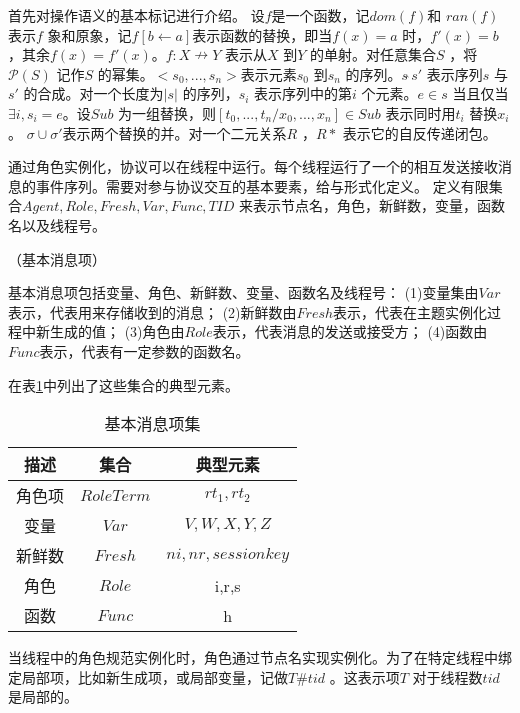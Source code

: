 首先对操作语义的基本标记进行介绍。
设$f$是一个函数，记$dom(f)$和 $ran(f)$ 表示$f$ 象和原象，记$f[b\leftarrow a]$表示函数的替换，即当$f(x)=a$ 时，$f'(x)=b$ ，其余$f(x)=f'(x)$。$f:X\nrightarrow Y$ 表示从$X$ 到$Y$ 的单射。对任意集合$S$ ，将$\mathcal{P}(S)$ 记作$S$ 的幂集。$<{{s}_{0}},...,{{s}_{n}}>$表示元素${{s}_{0}}$ 到${{s}_{n}}$ 的序列。$s\hat{\ }s'$ 表示序列$s$ 与$s'$ 的合成。对一个长度为$|s|$ 的序列，${{s}_{i}}$ 表示序列中的第$i$ 个元素。$e\in s$ 当且仅当$\exists i,{{s}_{i}}=e$。设$Sub$ 为一组替换，则$[{{t}_{0}},...,{{t}_{n}}/{{x}_{0}},...,{{x}_{n}}]\in Sub$ 表示同时用${{t}_{i}}$ 替换${{x}_{i}}$ 。 $\sigma \cup \sigma '$表示两个替换的并。对一个二元关系$R$ ，$R*$ 表示它的自反传递闭包。


通过角色实例化，协议可以在线程中运行。每个线程运行了一个的相互发送接收消息的事件序列。需要对参与协议交互的基本要素，给与形式化定义。
定义有限集合$Agent,Role,Fresh,Var,Func,TID$ 来表示节点名，角色，新鲜数，变量，函数名以及线程号。
\begin{definition}{（基本消息项）}

基本消息项包括变量、角色、新鲜数、变量、函数名及线程号：
(1)变量集由$Var$表示，代表用来存储收到的消息；
(2)新鲜数由$Fresh$表示，代表在主题实例化过程中新生成的值；
(3)角色由$Role$表示，代表消息的发送或接受方；
(4)函数由$Func$表示，代表有一定参数的函数名。
\end{definition}

在表\ref{table:基本项集}中列出了这些集合的典型元素。

\begin{table}[htb]
  \centering
  \caption{基本消息项集}
\begin{tabular}{|c|c|c|}
  \hline
  描述 & 集合 & 典型元素  \\
  \hline
  角色项 & $RoleTerm$ & $rt_1,rt_2$  \\
  变量 & $Var$ & $V,W,X,Y,Z$ \\
  新鲜数 & $Fresh$ & $ni,nr,sessionkey$\\
  角色 &  $Role$   & i,r,s \\
  函数 & $Func$ & h \\
  \hline

\end{tabular}
\label{table:基本项集}
\end{table}


当线程中的角色规范实例化时，角色通过节点名实现实例化。为了在特定线程中绑定局部项，比如新生成项，或局部变量，记做$T\#tid$  。这表示项$T$ 对于线程数$tid$是局部的。

